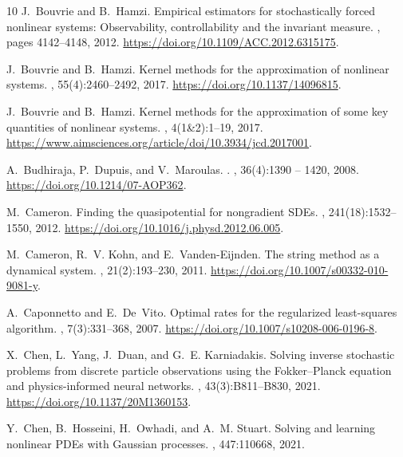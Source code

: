 \begin{thebibliography}{10}
J.~Bouvrie and B.~Hamzi.
\newblock Empirical estimators for stochastically forced nonlinear systems:
  Observability, controllability and the invariant measure.
, pages
  4142--4148, 2012.
\newblock \url{https://doi.org/10.1109/ACC.2012.6315175}.

J.~Bouvrie and B.~Hamzi.
\newblock Kernel methods for the approximation of nonlinear systems.
, 55(4):2460--2492, 2017.
\newblock \url{https://doi.org/10.1137/14096815}.

J.~Bouvrie and B.~Hamzi.
\newblock Kernel methods for the approximation of some key quantities of
  nonlinear systems.
, 4(1\&2):1--19, 2017.
\newblock \url{https://www.aimsciences.org/article/doi/10.3934/jcd.2017001}.

A.~Budhiraja, P.~Dupuis, and V.~Maroulas.
.
, 36(4):1390 -- 1420, 2008.
\newblock \url{https://doi.org/10.1214/07-AOP362}.

M.~Cameron.
\newblock Finding the quasipotential for nongradient {SDE}s.
, 241(18):1532--1550, 2012.
\newblock \url{https://doi.org/10.1016/j.physd.2012.06.005}.

M.~Cameron, R.~V. Kohn, and E.~Vanden-Eijnden.
\newblock The string method as a dynamical system.
, 21(2):193--230, 2011.
\newblock \url{https://doi.org/10.1007/s00332-010-9081-y}.

A.~Caponnetto and E.~De~Vito.
\newblock Optimal rates for the regularized least-squares algorithm.
, 7(3):331--368, 2007.
\newblock \url{https://doi.org/10.1007/s10208-006-0196-8}.

X.~Chen, L.~Yang, J.~Duan, and G.~E. Karniadakis.
\newblock Solving inverse stochastic problems from discrete particle
  observations using the {F}okker--{P}lanck equation and physics-informed
  neural networks.
, 43(3):B811--B830, 2021.
\newblock \url{https://doi.org/10.1137/20M1360153}.

\begingroup\color{blue}
Y.~Chen, B.~Hosseini, H.~Owhadi, and A.~M. Stuart.
\newblock Solving and learning nonlinear {PDE}s with {Gaussian} processes.
, 447:110668, 2021.
\par\endgroup


\end{thebibliography}
